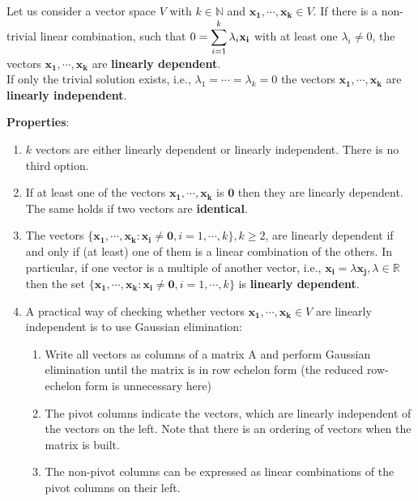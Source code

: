 Let us consider a vector space $V$ with $k \in \mathbb{N}$ and $\mathbf{x_1, \cdots, x_k} \in V$. If there is a non-trivial linear combination, such that $0 = \displaystyle\sum^k_{i=1} \lambda_i\mathbf{x_i}$ with at least one $\lambda_i \neq 0$, the vectors $\mathbf{x_1, \cdots, x_k}$ are \textbf{linearly dependent}. \\If only the trivial solution exists, i.e., $\lambda_1 = \cdots = \lambda_k = 0$ the vectors $\mathbf{x_1, \cdots, x_k}$ are \textbf{linearly independent}.

\vspace{0.3cm}
\noindent\textbf{Properties}:
\begin{enumerate}
    \item $k$ vectors are either linearly dependent or linearly independent. There is no third option.

    \item If at least one of the vectors $\mathbf{x_1, \cdots, x_k}$ is $\mathbf{0}$ then they are linearly dependent. The same holds if two vectors are \textbf{identical}.

    \item The vectors $\{\mathbf{x_1, \cdots, x_k} : \mathbf{x_i} \neq \mathbf{0}, i = 1, \cdots, k\}, k \geq 2$, are linearly dependent if and only if (at least) one of them is a linear combination of the others. In particular, if one vector is a multiple of another vector, i.e., $\mathbf{x_i} = \lambda\mathbf{x_j} , \lambda \in \mathbb{R}$ then the set $\{\mathbf{x_1, \cdots, x_k} : \mathbf{x_i} \neq \mathbf{0}, i = 1, \cdots, k\}$ is \textbf{linearly dependent}.

    \item A practical way of checking whether vectors $\mathbf{x_1, \cdots, x_k} \in V$ are linearly independent is to use Gaussian elimination: 
    \begin{enumerate}
        \item Write all vectors as columns of a matrix A and perform Gaussian elimination until the matrix is in row echelon form (the reduced row-echelon form is unnecessary here)
        
        \item The pivot columns indicate the vectors, which are linearly independent of the vectors on the left. Note that there is an ordering of vectors when the matrix is built.

        \item The non-pivot columns can be expressed as linear combinations of the pivot columns on their left.


\end{enumerate}
\end{enumerate}
